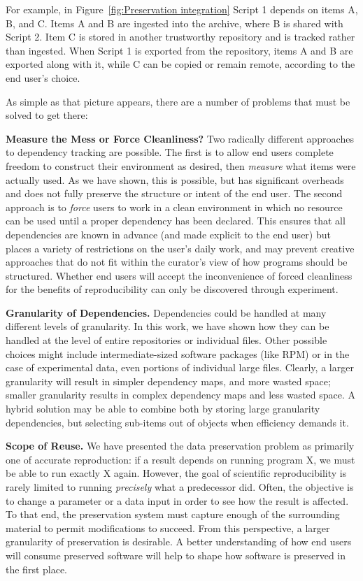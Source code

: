 \documentclass[procedia]{easychair}
\begin{document}
For example, in Figure~\ref{fig:Preservation integration} Script 1 depends on items A, B, and C.  Items A and B are ingested into the archive, where B is shared with Script 2.  Item C is stored in another trustworthy repository and is tracked rather than ingested.  When Script 1 is exported from the repository, items A and B are exported along with it, while C can be copied or remain remote, according to the end user's choice.

As simple as that picture appears, there are a number of problems that must be solved to get there:

{\bf Measure the Mess or Force Cleanliness?}  Two radically different approaches to dependency tracking are possible.  The first is to allow end users complete freedom to construct their environment as desired, then \emph{measure} what items were actually used.  As we have shown, this is possible, but has significant overheads and does not fully preserve the structure or intent of the end user.   The second approach is to \emph{force} users to work in a clean environment in which no resource can be used until a proper dependency has been declared.  This ensures that all dependencies are known in advance (and made explicit to the end user) but places a variety of restrictions on the user's daily work, and may prevent creative approaches that do not fit within the curator's view of how programs should be structured.  Whether end users will accept the inconvenience of forced cleanliness for the benefits of reproducibility can only be discovered through experiment.

{\bf Granularity of Dependencies.}  Dependencies could be handled
at many different levels of granularity.  In this work, we have shown
how they can be handled at the level of entire repositories or individual files.
Other possible choices might include intermediate-sized software packages
(like RPM) or in the case of experimental data, even portions of individual large files.  Clearly, a larger granularity will result in 
simpler dependency maps, and more wasted space; smaller granularity results
in complex dependency maps and less wasted space.  A hybrid solution may
be able to combine both by storing large granularity dependencies, but
selecting sub-items out of objects when efficiency demands it.

{\bf Scope of Reuse.}  We have presented the data preservation
problem as primarily one of accurate reproduction: if a result depends
on running program X, we must be able to run exactly X again.  However,
the goal of scientific reproducibility is rarely limited to running
\emph{precisely} what a predecessor did. Often, the objective is to
change a parameter or a data input in order to see how the result is affected.
To that end, the preservation system must capture enough of the surrounding
material to permit modifications to succeed.  From this perspective,
a larger granularity of preservation is desirable.  A better understanding of
how end users will consume preserved software will help to shape how
software is preserved in the first place.
\end{document}
